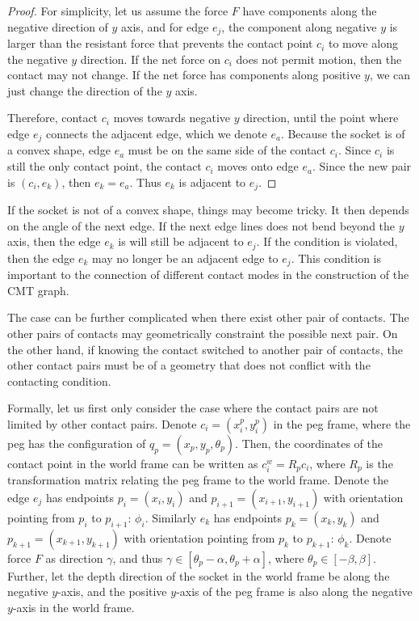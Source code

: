\documentclass[11p]{article}
\begin{document}
\begin{proof}
For simplicity, let us assume the force $F$ have components along the negative direction of $y$ axis, and for edge $e_j$, the component along negative $y$ is larger than the resistant force that prevents the contact point $c_i$ to move along the negative $y$ direction. If the net force on $c_i$ does not permit motion, then the contact may not change. If the net force has components along positive $y$, we can just change the direction of the $y$ axis. 

Therefore, contact $c_i$ moves towards negative $y$ direction, until the point where edge $e_j$ connects the adjacent edge, which we denote $e_a$. Because the socket is of a convex shape, edge $e_a$ must be on the same side of the contact $c_i$. Since $c_i$ is still the only contact point, the contact $c_i$ moves onto edge $e_a$. Since the new pair is $(c_i, e_k)$, then $e_k = e_a$. Thus $e_k$ is adjacent to $e_j$.  
\end{proof}

If the socket is not of a convex shape, things may become tricky. It then depends on the angle of the next edge. If the next edge lines does not bend beyond the $y$ axis, then the edge $e_k$ is will still be adjacent to $e_j$. If the condition is violated, then the edge $e_k$ may no longer be an adjacent edge to $e_j$. This condition is important to the connection of different contact modes in the construction of the CMT graph. 

The case can be further complicated when there exist other pair of contacts. The other pairs of contacts may geometrically constraint the possible next pair. On the other hand, if knowing the contact switched to another pair of contacts, the other contact pairs must be of a geometry that does not conflict with the contacting condition. 

Formally, let us first only consider the case where the contact pairs are not limited by other contact pairs. Denote $c_i = (x_i^p, y_i^p)$ in the peg frame, where the peg has the configuration of $q_p = (x_p, y_p, \theta_p)$. Then, the coordinates of the contact point in the world frame can be written as $c_i^w = R_pc_i$, where $R_p$ is the transformation matrix relating the peg frame to the world frame. Denote the edge $e_j$ has endpoints $p_i = (x_i, y_i)$ and $p_{i+1} = (x_{i+1}, y_{i+1})$ with orientation pointing from $p_i$ to $p_{i+1}$: $\phi_i$. Similarly $e_k$ has endpoints $p_k = (x_k, y_k)$ and $p_{k+1} = (x_{k+1}, y_{k+1})$ with orientation pointing from $p_k$ to $p_{k+1}$: $\phi_k$. Denote force $F$ as direction $\gamma$, and thus $\gamma \in [\theta_p - \alpha, \theta_p + \alpha]$, where $\theta_p \in [-\beta, \beta]$. Further, let the depth direction of the socket in the world frame be along the negative $y$-axis, and the positive $y$-axis of the peg frame is also along the negative $y$-axis in the world frame. 
\end{document}
